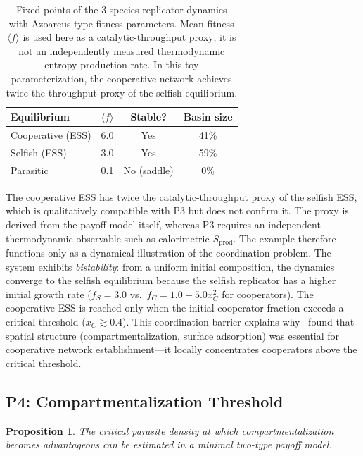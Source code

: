 \documentclass[12pt,a4paper]{article}
\newtheorem{proposition}{Proposition}
\theoremstyle{remark}
\begin{document}
\begin{table}[htbp]
\centering
\caption{Fixed points of the 3-species replicator dynamics with Azoarcus-type fitness parameters. Mean fitness $\langle f \rangle$ is used here as a catalytic-throughput proxy; it is not an independently measured thermodynamic entropy-production rate. In this toy parameterization, the cooperative network achieves twice the throughput proxy of the selfish equilibrium.}
\label{tab:replicator-fps}
\begin{tabular}{lccc}
\toprule
\textbf{Equilibrium} & $\langle f \rangle$ & \textbf{Stable?} & \textbf{Basin size} \\
\midrule
Cooperative (ESS) & 6.0 & Yes & 41\% \\
Selfish (ESS) & 3.0 & Yes & 59\% \\
Parasitic & 0.1 & No (saddle) & 0\% \\
\bottomrule
\end{tabular}
\end{table}

The cooperative ESS has twice the catalytic-throughput proxy of the selfish ESS, which is qualitatively compatible with P3 but does not confirm it. The proxy is derived from the payoff model itself, whereas P3 requires an independent thermodynamic observable such as calorimetric $\dot{S}_{\mathrm{prod}}$. The example therefore functions only as a dynamical illustration of the coordination problem. The system exhibits \emph{bistability}: from a uniform initial composition, the dynamics converge to the selfish equilibrium because the selfish replicator has a higher initial growth rate ($f_S = 3.0$ vs.\ $f_C = 1.0 + 5.0 x_C^2$ for cooperators). The cooperative ESS is reached only when the initial cooperator fraction exceeds a critical threshold ($x_C \gtrsim 0.4$). This coordination barrier explains why~\citet{AzoarcusPMC} found that spatial structure (compartmentalization, surface adsorption) was essential for cooperative network establishment---it locally concentrates cooperators above the critical threshold.

\subsection{P4: Compartmentalization Threshold}

\begin{proposition}
The critical parasite density at which compartmentalization becomes advantageous can be estimated in a minimal two-type payoff model.
\end{proposition}
\end{document}

